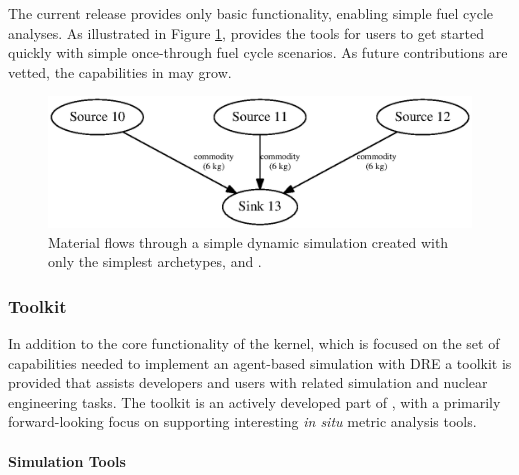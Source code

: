 The current \Cycamore release provides only 
basic functionality, enabling simple fuel cycle analyses. 
As illustrated in Figure \ref{fig:simplesim}, \Cycamore provides the tools for users
to get started quickly with simple 
once-through fuel cycle scenarios. As future contributions are vetted, the capabilities in \Cycamore may grow.

\begin{figure}[htbp!]
\begin{center}
\includegraphics{./images/simplesim}
\end{center}
\caption{Material flows through a simple dynamic simulation created with only the simplest \Cycamore archetypes,  and .}
\label{fig:simplesim}
\end{figure}

\subsubsection{Toolkit}

In addition to the core functionality of the \Cyclus kernel, which is focused on
the set of capabilities needed to implement an agent-based simulation
with \gls{DRE} a toolkit is provided that assists developers
and users with related simulation and nuclear engineering tasks. The toolkit is
an actively developed part of \Cyclus, with a primarily forward-looking
focus on supporting interesting \textit{in situ} metric analysis tools. 

\paragraph{Simulation Tools}

